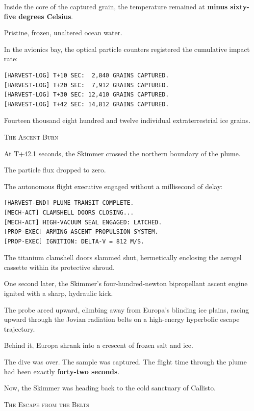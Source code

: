 \documentclass[12pt,twoside,openright]{book}
\newcommand{\sceneheader}[1]{%
  \par\vspace{1.8em}%
  {\noindent\centering\scshape\large #1\par}%
  \vspace{1.0em}%
  \noindent%
}
\newcommand{\dinkus}{%
  \par\vspace{1.2em}%
  {\noindent\centering{\large $\ast\quad\ast\quad\ast$}\par}%
  \vspace{1.2em}%
  \noindent%
}
\begin{document}
Inside the core of the captured grain, the temperature remained at
\textbf{minus sixty-five degrees Celsius}.

Pristine, frozen, unaltered ocean water.

In the avionics bay, the optical particle counters registered the
cumulative impact rate:

\begin{lstlisting}
[HARVEST-LOG] T+10 SEC:  2,840 GRAINS CAPTURED.
[HARVEST-LOG] T+20 SEC:  7,912 GRAINS CAPTURED.
[HARVEST-LOG] T+30 SEC: 12,410 GRAINS CAPTURED.
[HARVEST-LOG] T+42 SEC: 14,812 GRAINS CAPTURED.
\end{lstlisting}

Fourteen thousand eight hundred and twelve individual extraterrestrial
ice grains.

\dinkus

\sceneheader{The Ascent Burn}

At T+42.1 seconds, the Skimmer crossed the northern boundary of the
plume.

The particle flux dropped to zero.

The autonomous flight executive engaged without a millisecond of delay:

\begin{lstlisting}
[HARVEST-END] PLUME TRANSIT COMPLETE.
[MECH-ACT] CLAMSHELL DOORS CLOSING...
[MECH-ACT] HIGH-VACUUM SEAL ENGAGED: LATCHED.
[PROP-EXEC] ARMING ASCENT PROPULSION SYSTEM.
[PROP-EXEC] IGNITION: DELTA-V = 812 M/S.
\end{lstlisting}

The titanium clamshell doors slammed shut, hermetically enclosing the
aerogel cassette within its protective shroud.

One second later, the Skimmer's four-hundred-newton bipropellant ascent
engine ignited with a sharp, hydraulic kick.

The probe arced upward, climbing away from Europa's blinding ice plains,
racing upward through the Jovian radiation belts on a high-energy
hyperbolic escape trajectory.

Behind it, Europa shrank into a crescent of frozen salt and ice.

The dive was over. The sample was captured. The flight time through the
plume had been exactly \textbf{forty-two seconds}.

Now, the Skimmer was heading back to the cold sanctuary of Callisto.

\dinkus

\sceneheader{The Escape from the
Belts}
\end{document}
